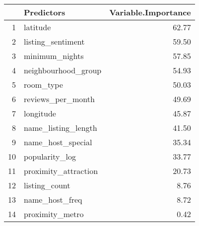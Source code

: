 \begin{table}[ht]
\centering


\begin{tabular}{rlr}
  \hline
 & Predictors & Variable.Importance \\ 
  \hline
  1 & latitude & 62.77 \\ 
  2 & listing\_sentiment & 59.50 \\ 
  3 & minimum\_nights & 57.85 \\ 
  4 & neighbourhood\_group & 54.93 \\ 
  5 & room\_type & 50.03 \\ 
  6 & reviews\_per\_month & 49.69 \\ 
  7 & longitude & 45.87 \\ 
  8 & name\_listing\_length & 41.50 \\ 
  9 & name\_host\_special & 35.34 \\ 
  10 & popularity\_log & 33.77 \\ 
  11 & proximity\_attraction & 20.73 \\ 
  12 & listing\_count & 8.76 \\ 
  13 & name\_host\_freq & 8.72 \\ 
  14 & proximity\_metro & 0.42 \\ 
   \hline
\end{tabular}
\end{table}
